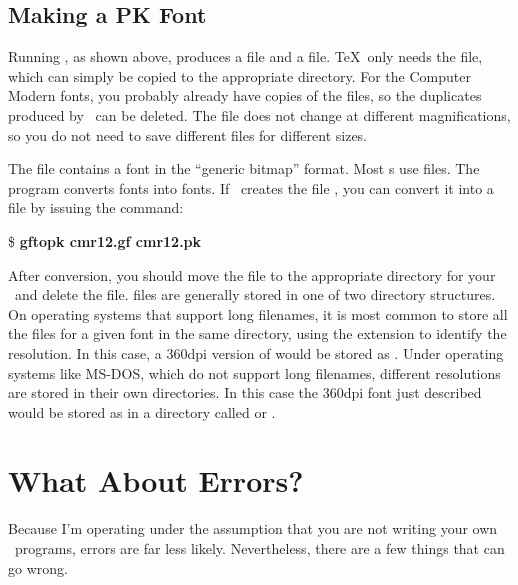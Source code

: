 \subsection{Making a PK Font}

Running 
\MF, as shown above, produces a  file and a 
file.  \TeX\ only needs the  file, which can simply be copied
to the appropriate directory.  For the Computer Modern fonts, you
probably already have copies of the  files, so the duplicates
produced by \MF\ can
be deleted. The  file does not change at
different magnifications, so you do not need to save different
 files for different sizes.

The  file contains a font in the ``generic bitmap'' format.
Most \dvidriver{}s use  files.  The  program
converts  fonts into  fonts.
If \MF\ creates the file , you can convert it into
a  file by issuing the command:

\begin{ttindent}
  \$ \textbf{gftopk cmr12.gf cmr12.pk}
\end{ttindent}

After conversion, you should move the  file to the appropriate
directory for your \dvidriver\ and delete the  file.   files
are generally stored in one of two directory structures.  On operating systems
that support long filenames, it is most common to store all the 
files for a given font in the same directory, using the extension to identify
the resolution.  In this case, a 360dpi version of  would be
stored as .  Under operating systems like MS-DOS, which
do not support long filenames, different resolutions are stored in their
own directories.  In this case the 360dpi font just described would be stored
as  in a directory called  or
.

\section{What About Errors?}

Because I'm operating under the assumption that you are not writing your
own \MF\ programs, errors are 
far less likely.  Nevertheless,
there are a few things that can go wrong.

